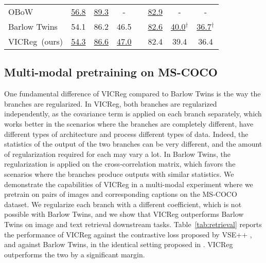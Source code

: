 \documentclass{article}
\newcommand{\algo}{VICReg}
\begin{document}
\begin{table}[t]
\begin{tabular}{ @{} l ccc c ccc @{} }
	    OBoW \cite{gidaris2021obow}         & \underline{56.8} & \underline{89.3} & -    && \underline{82.9} & - & - \\
	    Barlow Twins~\cite{grill2020byol}   & 54.1 & 86.2 & 46.5 && \underline{82.6} & \hspace{0.41em}\underline{40.0}$^{\dagger}$ & \hspace{0.41em}\underline{36.7}$^{\dagger}$ \\
\algo \ (ours)                      & \underline{54.3} & \underline{86.6} & \underline{47.0} && 82.4 & 39.4 & 36.4 \\
      \bottomrule
    \end{tabular}
\end{table}

\subsection{Multi-modal pretraining on MS-COCO}

One fundamental difference of VICReg compared to Barlow Twins is the way the branches are regularized. In VICReg, both branches are regularized independently, as the covariance term is applied on each branch separately, which works better in the scenarios where the branches are completely different, have different types of architecture and process different types of data. Indeed, the statistics of the output of the two branches can be very different, and the amount of regularization required for each may vary a lot. In Barlow Twins, the regularization is applied on the cross-correlation matrix, which favors the scenarios where the branches produce outputs with similar statistics. We demonstrate the capabilities of VICReg in a multi-modal experiment where we pretrain on pairs of images and corresponding captions on the MS-COCO dataset. We regularize each branch with a different coefficient, which is not possible with Barlow Twins, and we show that VICReg outperforms Barlow Twins on image and text retrieval downstream tasks. Table~\ref{tab:retrieval} reports the performance of VICReg against the contrastive loss proposed by VSE++ \cite{faghri2018vse}, and against Barlow Twins, in the identical setting proposed in \cite{faghri2018vse}. VICReg outperforms the two by a significant margin.
\end{document}
